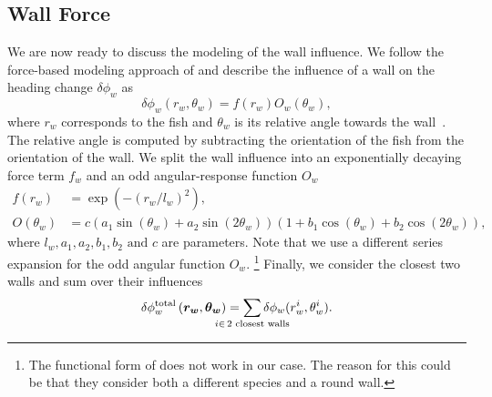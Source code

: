 \documentclass[nobib, a4paper]{tufte-handout}
\begin{document}
\subsection{Wall Force}
We are now ready to discuss the modeling of the wall influence.
We follow the force-based modeling approach of \citeauthor{calovi} and describe the influence of a wall on the heading change \(\delta \phi_w\) as
\begin{equation*}
  \delta \phi_w (r_w, \theta_w) = f(r_w)O_w(\theta_w),
\end{equation*}
where $r_w$ corresponds to the fish and $\theta_w$ is its relative angle towards the wall~\autocite{calovi}.
The relative angle is computed by subtracting the orientation of the fish from the orientation of the wall.
We split the wall influence into an exponentially decaying force term \(f_w\) and an odd angular-response function \(O_w\)
\begin{align*}
  f(r_w) &= \exp \left( -{(r_w/l_w)}^2 \right), \\
  O(\theta_w) &= c \left(a_1 \sin(\theta_w) + a_2 \sin(2  \theta_w)  \right)  \left(1 +  b_1  \cos(\theta_w) + b_2 \cos(2  \theta_w) \right),
\end{align*}
where $l_w, a_1, a_2, b_1, b_2 \text{ and } c$ are parameters.
Note that we use a different series expansion for the odd angular function \(O_w\).%
\footnote{The functional form of \citeauthor{calovi} does not work in our case.
  The reason for this could be that they consider both a different species and a round wall.}
Finally, we consider the closest two walls and sum over their influences
\begin{equation*}
 \delta \phi_w^{\text{total}} \left( \bm{r_w}, \bm{\theta_w} \right) = \sum_{\mathclap{i \in \, 2 \text{ closest walls}}} \delta \phi_w (r_w^i, \theta_w^i).
\end{equation*}
\end{document}
